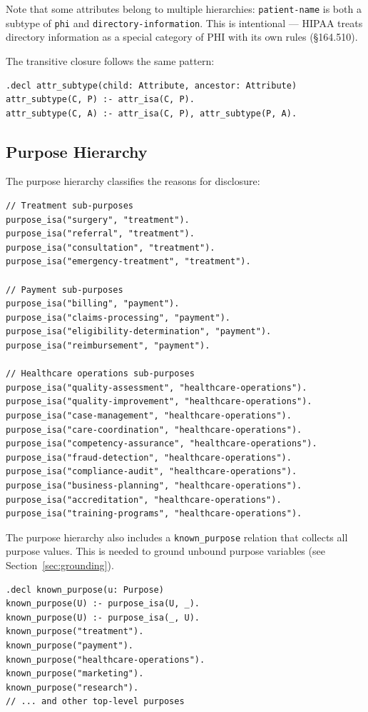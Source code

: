 \documentclass[11pt,letterpaper]{article}
\begin{document}
Note that some attributes belong to multiple hierarchies: \texttt{patient-name} is both a subtype of \texttt{phi} and \texttt{directory-information}. This is intentional --- HIPAA treats directory information as a special category of PHI with its own rules (\S 164.510).

The transitive closure follows the same pattern:
\begin{lstlisting}[style=soufflestyle]
.decl attr_subtype(child: Attribute, ancestor: Attribute)
attr_subtype(C, P) :- attr_isa(C, P).
attr_subtype(C, A) :- attr_isa(C, P), attr_subtype(P, A).
\end{lstlisting}

\subsection{Purpose Hierarchy}

The purpose hierarchy classifies the reasons for disclosure:

\begin{lstlisting}[style=soufflestyle,caption={Purpose hierarchy (selected entries)}]
// Treatment sub-purposes
purpose_isa("surgery", "treatment").
purpose_isa("referral", "treatment").
purpose_isa("consultation", "treatment").
purpose_isa("emergency-treatment", "treatment").

// Payment sub-purposes
purpose_isa("billing", "payment").
purpose_isa("claims-processing", "payment").
purpose_isa("eligibility-determination", "payment").
purpose_isa("reimbursement", "payment").

// Healthcare operations sub-purposes
purpose_isa("quality-assessment", "healthcare-operations").
purpose_isa("quality-improvement", "healthcare-operations").
purpose_isa("case-management", "healthcare-operations").
purpose_isa("care-coordination", "healthcare-operations").
purpose_isa("competency-assurance", "healthcare-operations").
purpose_isa("fraud-detection", "healthcare-operations").
purpose_isa("compliance-audit", "healthcare-operations").
purpose_isa("business-planning", "healthcare-operations").
purpose_isa("accreditation", "healthcare-operations").
purpose_isa("training-programs", "healthcare-operations").
\end{lstlisting}

The purpose hierarchy also includes a \texttt{known\_purpose} relation that collects all purpose values. This is needed to ground unbound purpose variables (see Section~\ref{sec:grounding}).

\begin{lstlisting}[style=soufflestyle,caption={known\_purpose for grounding}]
.decl known_purpose(u: Purpose)
known_purpose(U) :- purpose_isa(U, _).
known_purpose(U) :- purpose_isa(_, U).
known_purpose("treatment").
known_purpose("payment").
known_purpose("healthcare-operations").
known_purpose("marketing").
known_purpose("research").
// ... and other top-level purposes
\end{lstlisting}
\end{document}

